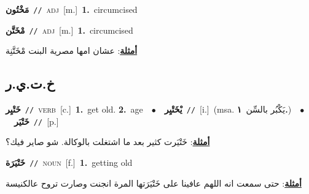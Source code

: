 \documentclass[10pt,a4paper,twoside]{article} %
\begin{document}
\begin{multicols}{2}
{{{{{{\setlength\topsep{0pt}\textbf{\foreignlanguage{arabic}{مَخْتُون}}\ {\color{gray}\texttt{//}\color{black}}\ \textsc{adj}\ [m.]\ \textbf{1.}~circumcised\ 

{\setlength\topsep{0pt}\textbf{\foreignlanguage{arabic}{مْخَتَّن}}\ {\color{gray}\texttt{//}\color{black}}\ \textsc{adj}\ [m.]\ \textbf{1.}~circumcised\  \begin{flushright}\color{gray}\foreignlanguage{arabic}{\textbf{\underline{\foreignlanguage{arabic}{أمثلة}}}: عشان امها مصرية البنت مْخَتَّنِة}\end{flushright}\color{black}} \vspace{2mm}

\vspace{-3mm}
\subsection*{\color{blue}\foreignlanguage{arabic}{خ.ت.ي.ر}\color{blue}{}} 

{\setlength\topsep{0pt}\textbf{\foreignlanguage{arabic}{خَتْيِر}}\ {\color{gray}\texttt{//}\color{black}}\ \textsc{verb}\ [c.]\ \textbf{1.}~get old.  \textbf{2.}~age\ \ $\bullet$\ \ \setlength\topsep{0pt}\textbf{\foreignlanguage{arabic}{يْخَتْيِر}}\ {\color{gray}\texttt{//}\color{black}}\ [i.]\ \color{gray}(msa. \foreignlanguage{arabic}{يَكْبُر بالسِّن}~\foreignlanguage{arabic}{\textbf{١.}})\color{black}\ \ $\bullet$\ \ \setlength\topsep{0pt}\textbf{\foreignlanguage{arabic}{خَتْيَر}}\ {\color{gray}\texttt{//}\color{black}}\ [p.]\  \begin{flushright}\color{gray}\foreignlanguage{arabic}{\textbf{\underline{\foreignlanguage{arabic}{أمثلة}}}: خَتْيَرت كثير بعد ما اشتغلت بالوكالة. شو صاير فيك؟}\end{flushright}\color{black}} \vspace{2mm}

{\setlength\topsep{0pt}\textbf{\foreignlanguage{arabic}{خَتْيَرَة}}\ {\color{gray}\texttt{//}\color{black}}\ \textsc{noun}\ [f.]\ \textbf{1.}~getting old\  \begin{flushright}\color{gray}\foreignlanguage{arabic}{\textbf{\underline{\foreignlanguage{arabic}{أمثلة}}}: حتى سمعت انه اللهم عافينا على خَتْيَرَتها المرة انجنت وصارت تروح عالكنيسة}\end{flushright}\color{black}} \vspace{2mm}

}}}}}}
\end{multicols}
\end{document}
